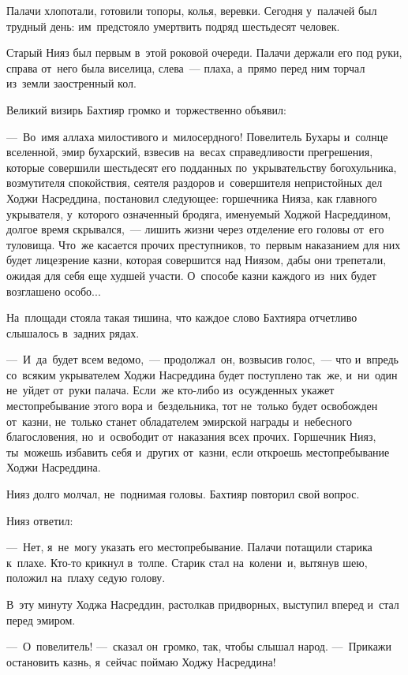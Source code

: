 \documentclass[12pt,a4paper]{book}
\begin{document}
Палачи хлопотали, готовили топоры, колья, веревки. Сегодня у~палачей был трудный день: им~предстояло умертвить подряд шестьдесят человек.

Старый Нияз был первым в~этой роковой очереди. Палачи держали его под руки, справа от~него была виселица, слева~— плаха, а~прямо перед ним торчал из~земли заостренный кол.

Великий визирь Бахтияр громко и~торжественно объявил:

—~Во~имя аллаха милостивого и~милосердного! Повелитель Бухары и~солнце вселенной, эмир бухарский, взвесив на~весах справедливости прегрешения, которые совершили шестьдесят его подданных по~укрывательству богохульника, возмутителя спокойствия, сеятеля раздоров и~совершителя непристойных дел Ходжи Насреддина, постановил следующее: горшечника Нияза, как главного укрывателя, у~которого означенный бродяга, именуемый Ходжой Насреддином, долгое время скрывался,~— лишить жизни через отделение его головы от~его туловища. Что~же касается прочих преступников, то~первым наказанием для них будет лицезрение казни, которая совершится над Ниязом, дабы они трепетали, ожидая для себя еще худшей участи. О~способе казни каждого из~них будет возглашено особо...

На~площади стояла такая тишина, что каждое слово Бахтияра отчетливо слышалось в~задних рядах.

—~И~да~будет всем ведомо,~— продолжал~он, возвысив голос,~— что и~впредь со~всяким укрывателем Ходжи Насреддина будет поступлено так~же, и~ни~один не~уйдет от~руки палача. Если~же кто-либо из~осужденных укажет местопребывание этого вора и~бездельника, тот не~только будет освобожден от~казни, не~только станет обладателем эмирской награды и~небесного благословения, но~и~освободит от~наказания всех прочих. Горшечник Нияз, ты~можешь избавить себя и~других от~казни, если откроешь местопребывание Ходжи Насреддина.

Нияз долго молчал, не~поднимая головы. Бахтияр повторил свой вопрос.

Нияз ответил:

—~Нет, я~не~могу указать его местопребывание. Палачи потащили старика к~плахе. Кто-то крикнул в~толпе. Старик стал на~колени~и, вытянув шею, положил на~плаху седую голову.

В~эту минуту Ходжа Насреддин, растолкав придворных, выступил вперед и~стал перед эмиром.

—~О~повелитель! —~сказал он~громко, так, чтобы слышал народ. —~Прикажи остановить казнь, я~сейчас поймаю Ходжу Насреддина!
\end{document}
